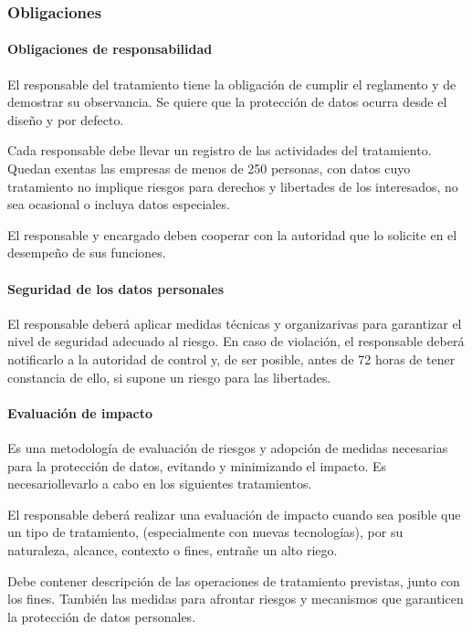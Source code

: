     \subsubsection{Obligaciones}
        \paragraph{Obligaciones de responsabilidad}
            El responsable del tratamiento tiene la obligación de cumplir el reglamento y de demostrar su observancia. Se quiere que la protección de datos ocurra desde el diseño y por defecto.

            Cada responsable debe llevar un registro de las actividades del tratamiento. Quedan exentas las empresas de menos de 250 personas, con datos cuyo tratamiento no implique riesgos para derechos y libertades de los interesados, no sea ocasional o incluya datos especiales.

            El responsable y encargado deben cooperar con la autoridad que lo solicite en el desempeño de sus funciones.

        \paragraph{Seguridad de los datos personales}
            El responsable deberá aplicar medidas técnicas y organizarivas para garantizar el nivel de seguridad adecuado al riesgo. En caso de violación, el responsable deberá notificarlo a la autoridad de control y, de ser posible, antes de 72 horas de tener constancia de ello, si supone un riesgo para las libertades.

        \paragraph{Evaluación de impacto}
            Es una metodología de evaluación de riesgos y adopción de medidas necesarias para la protección de datos, evitando y minimizando el impacto. Es necesariollevarlo a cabo en los siguientes tratamientos.

            El responsable deberá realizar una evaluación de impacto cuando sea posible que un tipo de tratamiento, (especialmente con nuevas tecnologías), por su naturaleza, alcance, contexto o fines, entrañe un alto riego. 

            Debe contener descripción de las operaciones de tratamiento previstas, junto con los fines. También las medidas para afrontar riesgos y mecanismos que garanticen la protección de datos personales.

